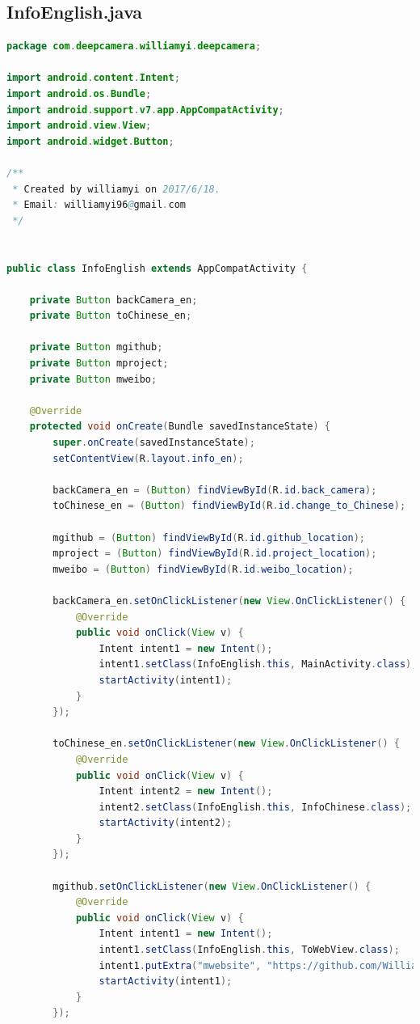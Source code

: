 \documentclass[UTF8, Microsoft YaHei]{book}
\begin{document}
    \subsection{InfoEnglish.java}
\begin{small}
\begin{lstlisting}[language=java]
package com.deepcamera.williamyi.deepcamera;

import android.content.Intent;
import android.os.Bundle;
import android.support.v7.app.AppCompatActivity;
import android.view.View;
import android.widget.Button;

/**
 * Created by williamyi on 2017/6/18.
 * Email: williamyi96@gmail.com
 */


public class InfoEnglish extends AppCompatActivity {

    private Button backCamera_en;
    private Button toChinese_en;

    private Button mgithub;
    private Button mproject;
    private Button mweibo;

    @Override
    protected void onCreate(Bundle savedInstanceState) {
        super.onCreate(savedInstanceState);
        setContentView(R.layout.info_en);

        backCamera_en = (Button) findViewById(R.id.back_camera);
        toChinese_en = (Button) findViewById(R.id.change_to_Chinese);

        mgithub = (Button) findViewById(R.id.github_location);
        mproject = (Button) findViewById(R.id.project_location);
        mweibo = (Button) findViewById(R.id.weibo_location);

        backCamera_en.setOnClickListener(new View.OnClickListener() {
            @Override
            public void onClick(View v) {
                Intent intent1 = new Intent();
                intent1.setClass(InfoEnglish.this, MainActivity.class);
                startActivity(intent1);
            }
        });

        toChinese_en.setOnClickListener(new View.OnClickListener() {
            @Override
            public void onClick(View v) {
                Intent intent2 = new Intent();
                intent2.setClass(InfoEnglish.this, InfoChinese.class);
                startActivity(intent2);
            }
        });

        mgithub.setOnClickListener(new View.OnClickListener() {
            @Override
            public void onClick(View v) {
                Intent intent1 = new Intent();
                intent1.setClass(InfoEnglish.this, ToWebView.class);
                intent1.putExtra("mwebsite", "https://github.com/WilliamYi96");
                startActivity(intent1);
            }
        });


\end{lstlisting}
\end{small}
\end{document}
